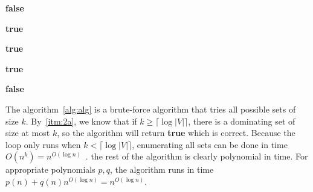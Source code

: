 \documentclass{amsart}
\theoremstyle{plain}
\theoremstyle{definition}
\begin{document}
\begin{enumerate}[label=\textbf{Exercise \arabic*:}, leftmargin=0cm, labelwidth=-0.2cm, align=left]
\begin{enumerate}[label=\alph*)]
\begin{algorithm}
\begin{algorithmic}[1]
                            \State \Return \textbf{false}
                        \EndIf

                            \State \Return \textbf{true}
                        \EndIf

                            \State \Return \textbf{true}
                        \EndIf

                                \State \Return \textbf{true}
                            \EndIf

                        \EndFor

                        \State \Return \textbf{false}

                    \EndFunction
                \end{algorithmic}
            \end{algorithm}

            The algorithm~\ref{alg:alg} is a brute-force algorithm that tries all possible sets of size $k$.
            By~\ref{itm:2a}, we know that if $k \geq \lceil \log |V| \rceil$, there is a dominating set of size at most $k$,
            so the algorithm will return \textbf{true} which is correct.
            Because the loop only runs when $k < \lceil \log |V| \rceil$,
            enumerating all sets can be done in time $O(n^k) = n^{O(\log n)}$~\cite{reingold1977combinatorial}.
            the rest of the algorithm is clearly polynomial in time.
            For appropriate polynomials $p, q$, the algorithm
            runs in time $p(n) + q(n) n^{O(\log n)} = n^{O(\log n)}$.

            \end{enumerate}

    \end{enumerate}

    
    
\end{document}
